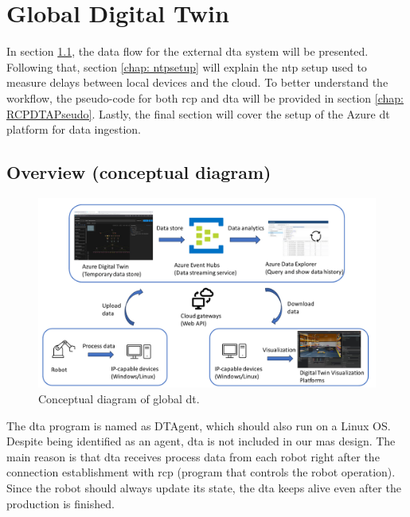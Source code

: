 \section{Global Digital Twin} \label{chap: Meth-External}
In section \ref{chap: Overview-External}, the data flow for the external 
\gls{dta} system will be presented. Following that, section \ref{chap: ntpsetup} 
will explain the \gls{ntp} setup used to measure delays between local devices and 
the cloud. To better understand the workflow, the pseudo-code for both \gls{rcp} 
and \gls{dta} will be provided in section \ref{chap: RCPDTAPseudo}. Lastly, the 
final section will cover the setup of the Azure \gls{dt} platform for data ingestion.



\subsection{Overview (conceptual diagram)}\label{chap: Overview-External}

\begin{figure}[htb]
    \centering
\includegraphics[width=\textwidth]{figures/DT_Conceptual_Diagram.pdf}
\caption{Conceptual diagram of global \gls{dt}. \label{fig: DTConceptual}}
\end{figure}

The \gls{dta} program is named as DTAgent, which 
should also run on a Linux OS.
Despite being identified as an agent, \gls{dta} is not included in our 
\gls{mas} design. The main reason is that \gls{dta} receives process data from 
each robot right after the connection establishment with \gls{rcp} 
(program that controls the robot operation). Since the robot 
should always update its state, the \gls{dta} keeps alive even 
after the production is finished. 


